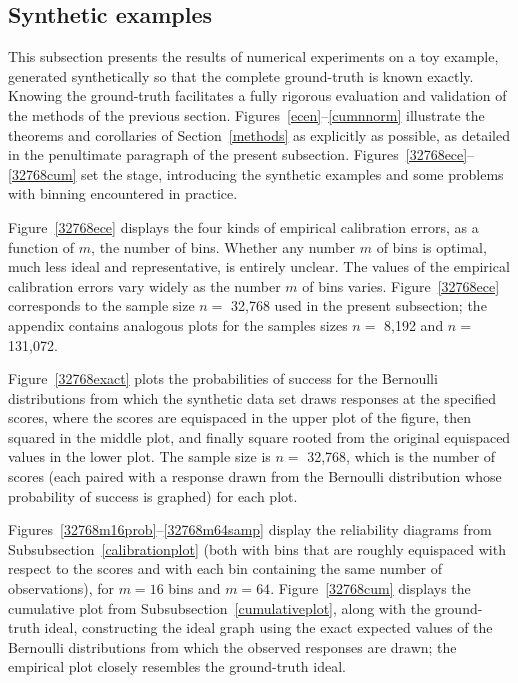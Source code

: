 \documentclass{article}
\begin{document}
\subsection{Synthetic examples}
\label{synthetic}

This subsection presents the results of numerical experiments
on a toy example, generated synthetically so that the complete ground-truth
is known exactly. Knowing the ground-truth facilitates a fully rigorous
evaluation and validation of the methods of the previous section.
Figures~\ref{ecen}--\ref{cumnnorm} illustrate the theorems and corollaries
of Section~\ref{methods} as explicitly as possible, as detailed
in the penultimate paragraph of the present subsection.
Figures~\ref{32768ece}--\ref{32768cum} set the stage,
introducing the synthetic examples and some problems with binning encountered
in practice.

Figure~\ref{32768ece} displays the four kinds of empirical calibration errors,
as a function of $m$, the number of bins.
Whether any number $m$ of bins is optimal, much less ideal and representative,
is entirely unclear. The values of the empirical calibration errors
vary widely as the number $m$ of bins varies.
Figure~\ref{32768ece} corresponds to the sample size $n =$ 32,768
used in the present subsection; the appendix contains analogous plots
for the samples sizes $n =$ 8,192 and $n =$ 131,072.

Figure~\ref{32768exact} plots the probabilities of success
for the Bernoulli distributions from which the synthetic data set
draws responses at the specified scores, where the scores
are equispaced in the upper plot of the figure,
then squared in the middle plot, and finally square rooted
from the original equispaced values in the lower plot.
The sample size is $n =$ 32,768, which is the number of scores
(each paired with a response drawn from the Bernoulli distribution
whose probability of success is graphed) for each plot.

Figures~\ref{32768m16prob}--\ref{32768m64samp} display the reliability diagrams
from Subsubsection~\ref{calibrationplot}
(both with bins that are roughly equispaced with respect to the scores
and with each bin containing the same number of observations),
for $m = 16$ bins and $m = 64$.
Figure~\ref{32768cum} displays the cumulative plot
from Subsubsection~\ref{cumulativeplot},
along with the ground-truth ideal, constructing the ideal graph
using the exact expected values of the Bernoulli distributions
from which the observed responses are drawn; the empirical plot
closely resembles the ground-truth ideal.
\end{document}
